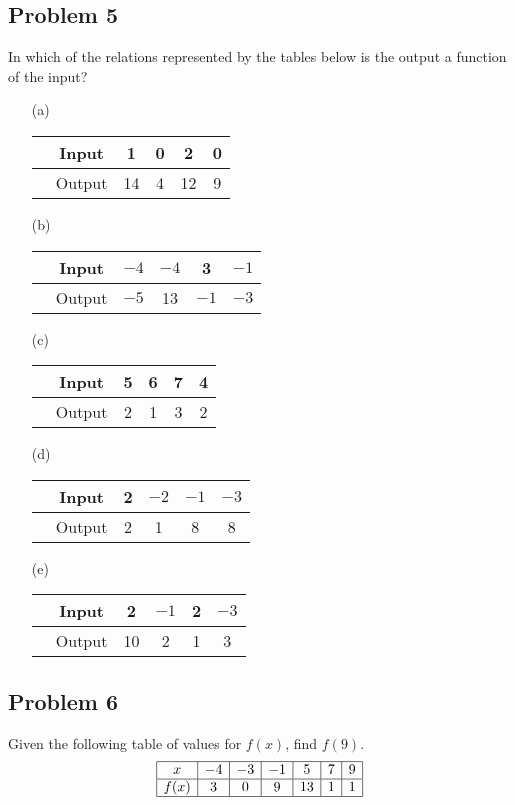 \documentclass[12pt]{article}
\begin{document}
\subsection*{Problem 5}
In which of the relations represented by the tables below is the output a function of the input?\\
    \begin{enumerate}
    \item[(a)]
    \begin{tabular}{|c|c|c|c|c|c|}
        \hline
        & Input & 1 & 0 & 2 & 0 \\ \hline
        & Output & 14 & 4 & 12 & 9 \\ \hline
    \end{tabular}
    
    \item[(b)]
    \begin{tabular}{|c|c|c|c|c|c|}
        \hline
        & Input & \(-4\) & \(-4\) & 3 & \(-1\) \\ \hline
        & Output & \(-5\) & 13 & \(-1\) & \(-3\) \\ \hline
    \end{tabular}
    
    \item[(c)]
    \begin{tabular}{|c|c|c|c|c|c|}
        \hline
        & Input & 5 & 6 & 7 & 4 \\ \hline
        & Output & 2 & 1 & 3 & 2 \\ \hline
    \end{tabular}
    
    \item[(d)]
    \begin{tabular}{|c|c|c|c|c|c|}
        \hline
        & Input & 2 & \(-2\) & \(-1\) & \(-3\) \\ \hline
        & Output & 2 & 1 & 8 & 8 \\ \hline
    \end{tabular}
    
    \item[(e)]
    \begin{tabular}{|c|c|c|c|c|c|}
        \hline
        & Input & 2 & \(-1\) & 2 & \(-3\) \\ \hline
        & Output & 10 & 2 & 1 & 3 \\ \hline
    \end{tabular}
    \end{enumerate}
\subsection*{Problem 6}
Given the following table of values for \(f(x)\), find \( f(9) \).
    \[
    \begin{array}{|c|c|c|c|c|c|c|} %
    \hline
    x & -4 & -3 & -1 & 5 & 7 & 9 \\ 
    \hline
    f(x) & 3 & 0 & 9 & 13 & 1 & 1 \\ 
    \hline
    \end{array}
    \]
\end{document}
